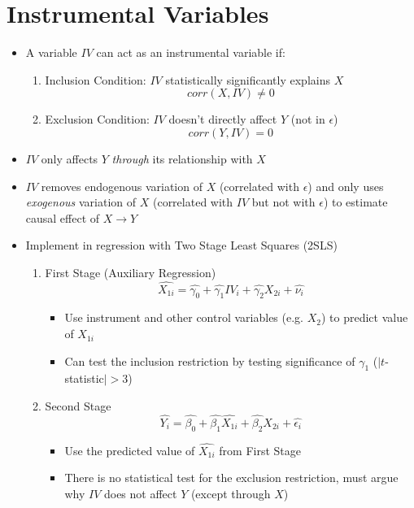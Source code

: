 \documentclass{article}
\begin{document}
\section*{Instrumental Variables}
\begin{itemize}
	\item A variable $IV$ can act as an instrumental variable if: 
	\begin{enumerate}
				\item Inclusion Condition: $IV$ statistically significantly explains $X$
				\begin{equation*}
				corr(X, IV) \neq 0	
				\end{equation*}
				\item Exclusion Condition: $IV$ doesn't directly affect $Y$ (not in $\epsilon$)
				\begin{equation*}
				corr(Y, IV) = 0	
				\end{equation*}
	\end{enumerate}
	\item $IV$ only affects $Y$ \emph{through} its relationship with $X$
	\item $IV$ removes endogenous variation of $X$ (correlated with $\epsilon$) and only uses \emph{exogenous} variation of $X$ (correlated with $IV$ but not with $\epsilon$) to estimate causal effect of $X \rightarrow Y$ 
	\item Implement in regression with Two Stage Least Squares (2SLS)
	\begin{enumerate}
		\item First Stage (Auxiliary Regression)
		\begin{equation*}
		\widehat{X_{1i}}=\widehat{\gamma_0}+\widehat{\gamma_1}IV_i+\widehat{\gamma_2}X_{2i}+ \widehat{\nu_i}	
		\end{equation*}
		\begin{itemize}
			\item Use instrument and other control variables (e.g. $X_2$) to predict value of $X_{1i}$
			\item Can test the inclusion restriction by testing significance of $\gamma_1$ ($|t$-statistic$|>3$)
		\end{itemize}
		\item Second Stage 
		\begin{equation*}
				\widehat{Y_i}=\hat{\beta_0}+\hat{\beta_1}\widehat{X_{1i}}+\hat{\beta_2}X_{2i}+ \widehat{\epsilon_i}		
		\end{equation*}
		\begin{itemize}
			\item Use the predicted value of $\widehat{X_{1i}}$ from First Stage 
			\item There is no statistical test for the exclusion restriction, must argue why $IV$ does not affect $Y$ (except through $X$)
		\end{itemize} 
	\end{enumerate}

\end{itemize}
\end{document}
